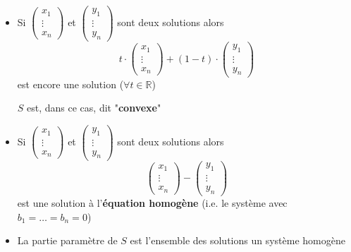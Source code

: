 \documentclass[
    11pt,
    a4paper,
    oneside,
    headinlcude, footinclude,
    twoside,
]{report}
\begin{document}
\begin{itemize}
    \item Si $\left(\begin{array}{c}x_{1}\\ \vdots\\ x_{n}\end{array}\right)$
        et $\left(\begin{array}{c}y_{1}\\ \vdots\\ y_{n}\end{array}\right)$
        sont deux solutions alors
        $$t \cdot \left(\begin{array}{c}x_{1}\\ \vdots\\ x_{n}\end{array}\right)
         + (1-t) \cdot \left(\begin{array}{c}y_{1}\\ \vdots\\ y_{n}\end{array}\right)
            $$
        est encore une solution ($\forall t \in \mathbb{R}$)

        $S$ est, dans ce cas, dit "\textbf{convexe}"

    \item Si $\left(\begin{array}{c}x_{1}\\ \vdots\\ x_{n}\end{array}\right)$
        et $\left(\begin{array}{c}y_{1}\\ \vdots\\ y_{n}\end{array}\right)$
        sont deux solutions alors
        $$\left(\begin{array}{c}x_{1}\\ \vdots\\ x_{n}\end{array}\right)
         - \left(\begin{array}{c}y_{1}\\ \vdots\\ y_{n}\end{array}\right)$$
        est une solution à l'\textbf{équation homogène} (i.e. le système avec
        $b_{1} = \ldots = b_{n} = 0$)

    \item La partie paramètre de $S$ est l'ensemble des solutions un système
        homogène


\end{itemize}
\end{document}
